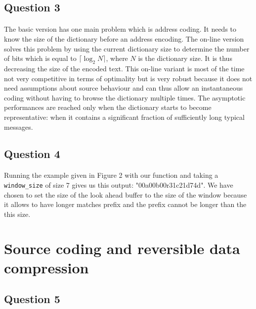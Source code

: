\documentclass[a4paper, 11pt, oneside]{article}
\begin{document}
\subsection{Question 3}
\paragraph{}The basic version has one main problem which is address coding. It needs to know the
size of the dictionary before an address encoding. The on-line version solves this problem by using the current dictionary size to determine the number of bits which is equal to $\lceil\log_2{N}\rceil$, where $N$ is the dictionary size. It is thus decreasing the size of the encoded text. This on-line variant is most of the time not very competitive in
terms of optimality but is very robust because it does not need assumptions about source behaviour and can thus allow an instantaneous coding without having to browse the dictionary multiple times. The asymptotic performances are reached only when the dictionary starts to become
representative: when it contains a significant fraction of sufficiently long typical messages.

\subsection{Question 4}
\paragraph{}Running the example given in Figure 2 with our function and taking a \texttt{window\_size} of size 7 gives us this output: "00a00b00r31c21d74d". We have chosen to set the size of the look ahead buffer to the size of the window because it allows to have longer matches prefix and the prefix cannot be longer than the this size.

\section{Source coding and reversible data compression}

\subsection{Question 5}
\end{document}
